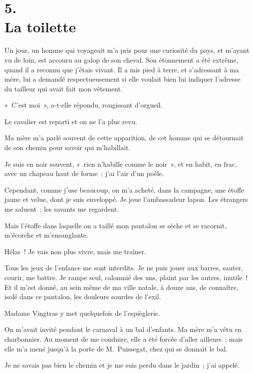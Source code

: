 \documentclass[french,twoside]{book} %
\begin{document}
\section[{5. La toilette}]{5. \\
La toilette}\renewcommand{\leftmark}{5. \\
La toilette}

\noindent Un jour, un homme qui voyageait m’a pris pour une curiosité du pays, et m’ayant vu de loin, est accouru au galop de son cheval. Son étonnement a été extrême, quand il a reconnu que j’étais vivant. Il a mis pied à terre, et s’adressant à ma mère, lui a demandé respectueusement si elle voulait bien lui indiquer l’adresse du tailleur qui avait fait mon vêtement.\par
« C’est moi », a-t-elle répondu, rougissant d’orgueil.\par
Le cavalier est reparti et on ne l’a plus revu.\par
Ma mère m’a parlé souvent de cette apparition, de cet homme qui se détournait de son chemin pour savoir qui m’habillait.\par
Je suis en noir souvent, « rien n’habille comme le noir », et en habit, en frac, avec un chapeau haut de forme ; j’ai l’air d’un poêle.\par
Cependant, comme j’use beaucoup, on m’a acheté, dans la campagne, une étoffe jaune et velue, dont je suis enveloppé. Je joue l’ambassadeur lapon. Les étrangers me saluent ; les savants me regardent.\par
Mais l’étoffe dans laquelle on a taillé mon pantalon se sèche et se racornit, m’écorche et m’ensanglante.\par
Hélas ! Je vais non plus vivre, mais me traîner.\par
Tous les jeux de l’enfance me sont interdits. Je ne puis jouer aux barres, sauter, courir, me battre. Je rampe seul, calomnié des uns, plaint par les autres, inutile ! Et il m’est donné, au sein même de ma ville natale, à douze ans, de connaître, isolé dans ce pantalon, les douleurs sourdes de l’exil.\par
\bigbreak
\noindent Madame Vingtras y met quelquefois de l’espièglerie.\par
On m’avait invité pendant le carnaval à un bal d’enfants. Ma mère m’a vêtu en charbonnier. Au moment de me conduire, elle a été forcée d’aller ailleurs ; mais elle m’a mené jusqu’à la porte de M. Puissegat, chez qui se donnait le bal.\par
Je ne savais pas bien le chemin et je me suis perdu dans le jardin ; j’ai appelé.\par
\end{document}
